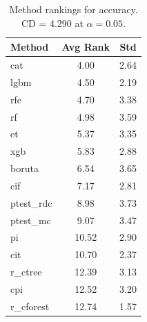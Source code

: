 \begin{table}[h]
\centering
\caption{Method rankings for accuracy. CD = 4.290 at $\alpha=0.05$.}
\label{tab:ranks_accuracy}
\begin{tabular}{lcc}
\toprule
Method & Avg Rank & Std \\
\midrule
cat & 4.00 & 2.64 \\
lgbm & 4.50 & 2.19 \\
rfe & 4.70 & 3.38 \\
rf & 4.98 & 3.59 \\
et & 5.37 & 3.35 \\
xgb & 5.83 & 2.88 \\
boruta & 6.54 & 3.65 \\
cif & 7.17 & 2.81 \\
ptest_rdc & 8.98 & 3.73 \\
ptest_mc & 9.07 & 3.47 \\
pi & 10.52 & 2.90 \\
cit & 10.70 & 2.37 \\
r_ctree & 12.39 & 3.13 \\
cpi & 12.52 & 3.20 \\
r_cforest & 12.74 & 1.57 \\
\bottomrule
\end{tabular}
\end{table}